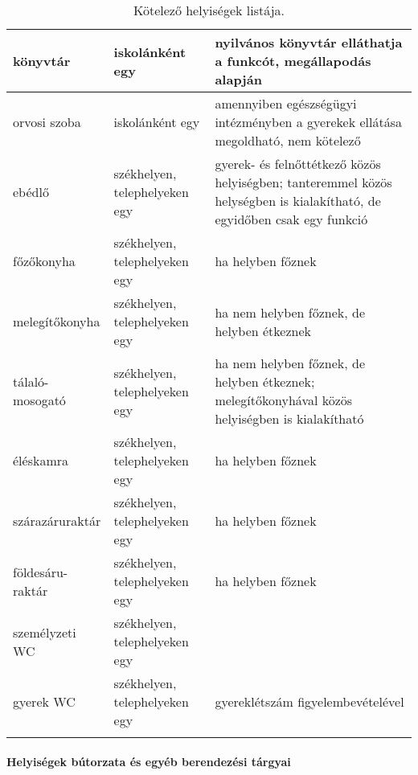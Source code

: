\begin{longtable}{@{}p{4cm}|p{4cm}|p{6cm}@{}}
    \\ \hline
    könyvtár                      & iskolánként egy                     &
    nyilvános
    könyvtár elláthatja a funkcót, megállapodás alapján
    \\ \hline
    orvosi szoba                  & iskolánként egy                     &
    amennyiben
    egészségügyi intézményben a gyerekek ellátása megoldható, nem kötelező
    \\
    \hline
    ebédlő                        & székhelyen, telephelyeken egy       &
    gyerek- és
    felnőttétkező közös helyiségben; tanteremmel közös helységben is kialakítható, de egyidőben csak egy funkció
    \\ \hline
    főzőkonyha                    & székhelyen, telephelyeken egy       &
    ha helyben
    főznek
    \\ \hline
    melegítőkonyha                & székhelyen, telephelyeken egy       &
    ha nem
    helyben főznek, de helyben étkeznek
    \\ \hline
    tálaló-mosogató               & székhelyen, telephelyeken egy       &
    ha nem
    helyben főznek, de helyben étkeznek; melegítőkonyhával közös helyiségben
    is
    kialakítható
    \\ \hline
    éléskamra                     & székhelyen, telephelyeken egy       &
    ha helyben
    főznek
    \\ \hline
    szárazáruraktár               & székhelyen, telephelyeken egy       &
    ha helyben
    főznek
    \\ \hline
    földesáru-raktár              & székhelyen, telephelyeken egy       &
    ha helyben
    főznek
    \\ \hline
    személyzeti WC                & székhelyen, telephelyeken egy       &

    \\ \hline
    gyerek WC                     & székhelyen, telephelyeken egy       &
    gyereklétszám figyelembevételével
    \\

    \caption{Kötelező helyiségek listája.}
    \label{tbl:helyisegek}

\end{longtable}

\vfill\eject

\paragraph{Helyiségek bútorzata és egyéb berendezési tárgyai}

